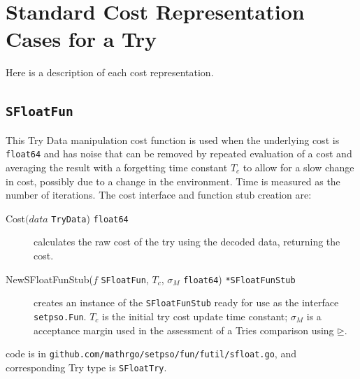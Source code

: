 \documentclass[a4paper,oneside,english]{book}
\numberwithin{equation}{section}
\numberwithin{figure}{section}
\newcommand{\codesorc}[1]{\texttt{github.com/mathrgo/setpso/#1}}
\begin{document}
\section{Standard Cost Representation Cases for a Try}
Here is a description of each cost representation.
\subsection{\texttt{SFloatFun}}
This  Try Data manipulation cost function is used when the underlying cost is  \texttt{float64} and has noise that can be removed by repeated evaluation of a cost and averaging the result with a forgetting time constant $T_c$ to allow for a slow change in cost, possibly due to a change in the environment. Time is measured as the number of iterations. The cost interface and function stub creation  are:
\begin{description}
	\item[Cost$ (data $ \texttt{TryData}) \texttt{float64}] calculates the raw cost of the try using the decoded data, returning  the cost.
	\item[NewSFloatFunStub($ f $ \texttt{SFloatFun}, $ T_c $, $ \sigma_M $ \texttt{float64}) \texttt{*SFloatFunStub} ] creates an instance of the \texttt{SFloatFunStub} ready for use as the interface \texttt{setpso.Fun}. $ T_c $ is the initial try cost update time constant; $ \sigma_M $ is a acceptance margin used in the assessment of a Tries comparison using $ \unrhd $.
\end{description}  
code is in \codesorc{fun/futil/sfloat.go}, and corresponding Try type is \texttt{SFloatTry}.
\end{document}
